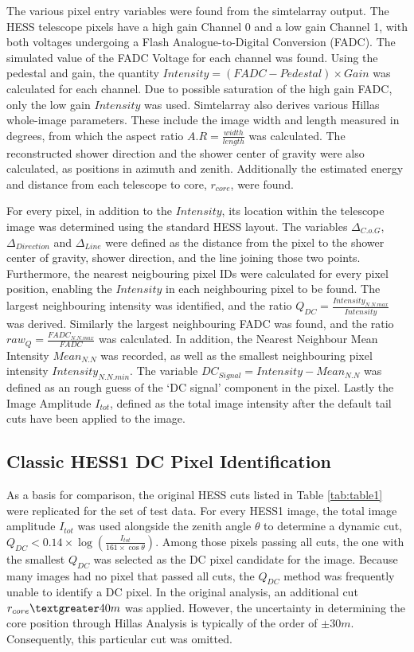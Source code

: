 \documentclass[11pt]{article}
\begin{document}
The various pixel entry variables were found from the sim\textunderscore telarray output. The HESS telescope pixels have a high gain Channel 0 and a low gain Channel 1, with both voltages undergoing a Flash Analogue-to-Digital Conversion (FADC). The simulated value of the FADC Voltage for each channel was found. Using the pedestal and gain, the quantity $Intensity = (FADC - Pedestal)\times Gain $ was calculated for each channel. Due to possible saturation of the high gain FADC, only the low gain $Intensity$ was used. Sim\textunderscore telarray also derives various Hillas whole-image parameters. These include the image width and length measured in degrees, from which the aspect ratio $A.R = \frac{width}{length}$ was calculated. The reconstructed shower direction and the shower center of gravity were also calculated, as positions in azimuth and zenith. Additionally the estimated energy and distance from each telescope to core, $r_{core}$,  were found.

For every pixel, in addition to the $Intensity$, its location within the telescope image was determined using the standard HESS layout. The variables $ \Delta_{C.o.G}$, $\Delta_{Direction}$ and $\Delta_{Line}$ were defined as the distance from the pixel to the shower center of gravity, shower direction, and the line joining those two points. Furthermore, the nearest neigbouring pixel IDs were calculated for every pixel position, enabling the $Intensity$ in each neighbouring pixel to be found. The largest neighbouring intensity was identified, and the ratio $Q_{DC} = \frac{Intensity_{N.N.max}}{Intensity}$ was derived. Similarly the largest neighbouring FADC was found, and the ratio $raw_{Q} = \frac{FADC_{N.N.max}}{FADC}$ was calculated. In addition, the Nearest Neighbour Mean Intensity $Mean_{N.N}$ was recorded, as well as the smallest neighbouring pixel intensity $Intensity_{N.N.min}$. The variable $DC_{Signal} = Intensity-Mean_{N.N}$ was defined as an rough guess of the \textquoteleft DC signal' component in the pixel. Lastly the Image Amplitude $I_{tot}$, defined as the total image intensity after the default tail cuts have been applied to the image.

\subsection{Classic HESS1 DC Pixel Identification}
As a basis for comparison, the original HESS cuts listed in Table \ref{tab:table1} were replicated for the set of test data. For every HESS1 image, the total image amplitude $I_{tot}$ was used alongside the zenith angle $\theta$ to determine a dynamic cut, $Q_{DC} < 0.14 \times \log(\frac{I_{tot}}{161 \times \cos \theta})$. Among those pixels passing all cuts, the one with the smallest $Q_{DC}$ was selected as the DC pixel candidate for the image. Because many images had no pixel that passed all cuts, the $Q_{DC}$ method was frequently unable to identify a DC pixel. In the original analysis, an additional cut $r_{core} \textgreater 40m$ was applied. However, the uncertainty in determining the core position through Hillas Analysis is typically of the order of $\pm 30m$. Consequently, this particular cut was omitted.
\end{document}
